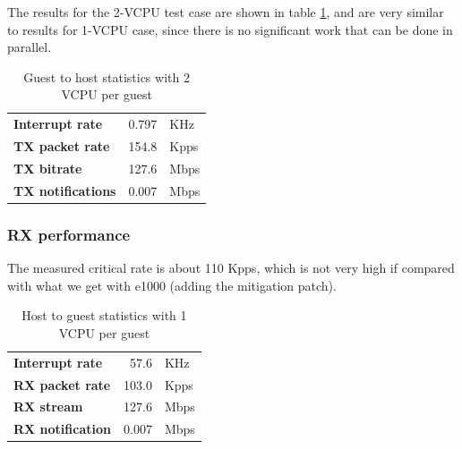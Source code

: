 \vspace{0.5cm}

The results for the 2-VCPU test case are shown in table \ref{tab:virtionet-tx-g2h2vcpu}, and are very similar to results for 1-VCPU case,
since there is no significant work that can be done in parallel.

\begin{table}
\begin{center}
\begin{tabular}{lrl}
\toprule
\textbf{Interrupt rate} & 0.797 & KHz\\
\textbf{TX packet rate} & 154.8 & Kpps\\
\textbf{TX bitrate} & 127.6 & Mbps\\
\textbf{TX notifications} & 0.007 & Mbps\\
\bottomrule
\end{tabular}
\end{center}
\caption{Guest to host statistics with 2 VCPU per guest}
\label{tab:virtionet-tx-g2h2vcpu}
\end{table}


\subsubsection{RX performance}
\label{sec:virtionet-perf-rx}
The measured critical rate is about 110 Kpps, which is not very high if compared with what we get with e1000 (adding the mitigation patch).

\begin{table}
\begin{center}
\begin{tabular}{lrl}
\toprule
\textbf{Interrupt rate} & 57.6 & KHz\\
\textbf{RX packet rate} & 103.0 & Kpps\\
\textbf{RX stream} & 127.6 & Mbps\\
\textbf{RX notification} & 0.007 & Mbps\\
\bottomrule
\end{tabular}
\end{center}
\caption{Host to guest statistics with 1 VCPU per guest}
\label{tab:virtionet-rx-g1hvcpu}
\end{table}

